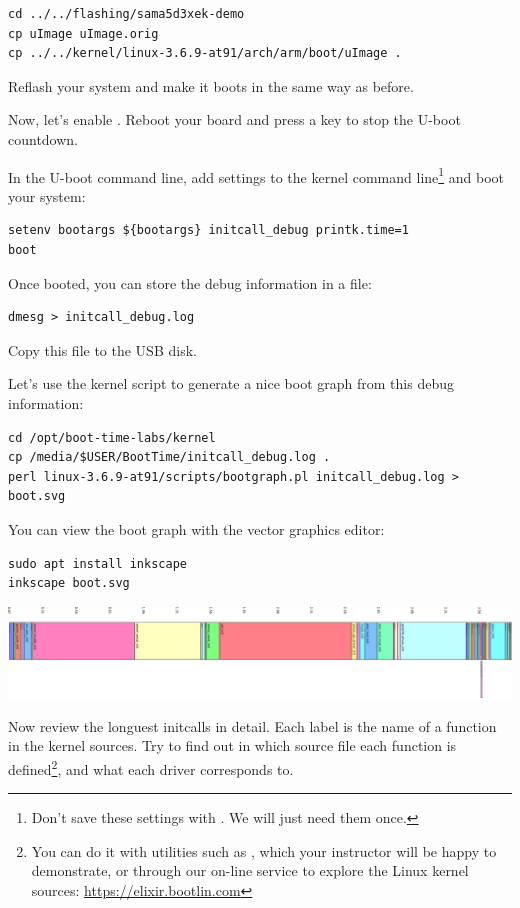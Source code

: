 \begin{verbatim}
cd ../../flashing/sama5d3xek-demo
cp uImage uImage.orig
cp ../../kernel/linux-3.6.9-at91/arch/arm/boot/uImage .
\end{verbatim}

Reflash your system and make it boots in the same way as before.

Now, let's enable . Reboot your board and press
a key to stop the U-boot countdown.

In the U-boot command line, add settings to the kernel command
line\footnote{Don't save these settings with . We
will just need them once.}
and boot your system:
\begin{verbatim}
setenv bootargs ${bootargs} initcall_debug printk.time=1
boot
\end{verbatim}

Once booted, you can store the debug information in a file:

\begin{verbatim}
dmesg > initcall_debug.log
\end{verbatim}

Copy this file to the USB disk.

Let's use the kernel script to generate a nice boot graph
from this debug information:

\begin{verbatim}
cd /opt/boot-time-labs/kernel
cp /media/$USER/BootTime/initcall_debug.log .
perl linux-3.6.9-at91/scripts/bootgraph.pl initcall_debug.log > boot.svg
\end{verbatim}

You can view the boot graph with the  vector graphics
editor:

\begin{verbatim}
sudo apt install inkscape
inkscape boot.svg
\end{verbatim}

\begin{center}
\includegraphics[width=\textwidth]{labs/boottime-kernel/boot.png}
\end{center}

Now review the longuest initcalls in detail. Each label is the name of
a function in the kernel sources. Try to find out in which source file
each function is defined\footnote{You can do it with utilities such as
, which your instructor will be happy to demonstrate,
or through our on-line service to explore the Linux kernel sources:
\url{https://elixir.bootlin.com}}, and what each driver corresponds
to.

